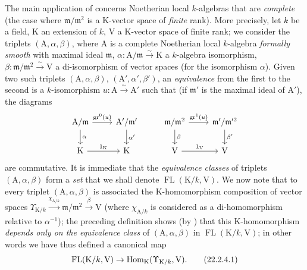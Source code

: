 \begin{env}[22.2.4]
\label{0.22.2.4}
The main application of  concerns Noetherian local $k$-algebras that are \emph{complete} (the case where $\mathfrak{m}/\mathfrak{m}^2$ is a $\mathrm{K}$-vector space of \emph{finite} rank).
More precisely, let $k$ be a field, $\mathrm{K}$ an extension of $k$, $\mathrm{V}$ a $\mathrm{K}$-vector space of
finite rank; we consider the triplets $(\mathrm{A},\alpha,\beta)$, where $\mathrm{A}$ is a complete Noetherian local $k$-algebra \emph{formally smooth} with maximal ideal $\mathfrak{m}$, $\alpha:\mathrm{A}/\mathfrak{m}\xrightarrow{\sim}\mathrm{K}$ a $k$-algebra isomorphism, $\beta:\mathfrak{m}/\mathfrak{m}^2\xrightarrow{\sim}\mathrm{V}$ a di-isomorphism of vector spaces (for the isomorphism $\alpha$).
Given two such triplets $(\mathrm{A},\alpha,\beta)$, $(\mathrm{A}',\alpha',\beta')$, an \emph{equivalence} from the first to the second is a $k$-isomorphism $u:\mathrm{A}\xrightarrow{\sim}\mathrm{A}'$ such that (if $\mathfrak{m}'$ is the maximal ideal of $\mathrm{A}'$), the diagrams
\[
  \begin{tikzcd}
    \mathrm{A}/\mathfrak{m} \ar[r,"\gr^0(u)"] \ar[d,"\alpha"] & \mathrm{A}'/\mathfrak{m}' \ar[d,"\alpha'"] & \mathfrak{m}/\mathfrak{m}^2 \ar[r,"\gr^1(u)"] \ar[d,"\beta"] & \mathfrak{m}'/\mathfrak{m}'^2 \ar[d,"\beta'"]\\
    \mathrm{K} \ar[r,"1_\mathrm{K}"] & \mathrm{K} & \mathrm{V} \ar[r,"1_\mathrm{V}"] & \mathrm{V}
  \end{tikzcd}
\]
are commutative.
It is immediate that the \emph{equivalence classes} of triplets $(\mathrm{A},\alpha,\beta)$ form a \emph{set} that we shall denote $\operatorname{FL}(\mathrm{K}/k,\mathrm{V})$.
We now note that to every triplet $(\mathrm{A},\alpha,\beta)$ is associated the $\mathrm{K}$-homomorphism composition of vector spaces $\Upsilon_{\mathrm{K}/k}\xrightarrow{\chi_{\mathrm{A}/k}}\mathfrak{m}/\mathfrak{m}^2\xrightarrow{\beta}\mathrm{V}$ (where $\chi_{\mathrm{A}/k}$ is considered as a di-homomorphism relative to $\alpha^{-1}$); the preceding definition shows (by ) that this $\mathrm{K}$-homomorphism \emph{depends only on the equivalence class} of $(\mathrm{A},\alpha,\beta)$ in $\operatorname{FL}(\mathrm{K}/k,\mathrm{V})$; in other words we have thus defined a canonical map
\[
\label{0.22.2.4.1}
  \operatorname{FL}(\mathrm{K}/k,\mathrm{V})\to\operatorname{Hom}_\mathrm{K}(\Upsilon_{\mathrm{K}/k},\mathrm{V}).
  \tag{22.2.4.1}
\]
\end{env}

